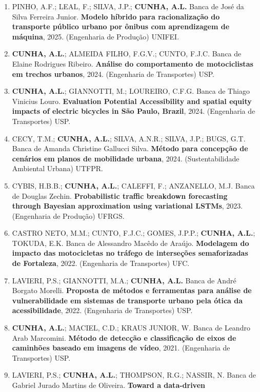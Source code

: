 \documentclass[
  brazilian,
  11pt,
  a4paper,
]{article}
\begin{document}
\begin{enumerate}
\def\labelenumi{\arabic{enumi}.}
\item
  PINHO, A.F.; LEAL, F.; SILVA, J.P.; \textbf{CUNHA, A.L.} Banca de José
  da Silva Ferreira Junior. \textbf{Modelo híbrido para racionalização
  do transporte público urbano por ônibus com aprendizagem de máquina},
  2025. (Engenharia de Produção) UNIFEI.
\item
  \textbf{CUNHA, A.L.}; ALMEIDA FILHO, F.G.V.; CUNTO, F.J.C. Banca de
  Elaine Rodrigues Ribeiro. \textbf{Análise do comportamento de
  motociclistas em trechos urbanos}, 2024. (Engenharia de Transportes)
  USP.
\item
  \textbf{CUNHA, A.L.}; GIANNOTTI, M.; LOUREIRO, C.F.G. Banca de Thiago
  Vinicius Louro. \textbf{Evaluation Potential Accessibility and spatial
  equity impacts of electric bicycles in São Paulo, Brazil}, 2024.
  (Engenharia de Transportes) USP.
\item
  CECY, T.M.; \textbf{CUNHA, A.L.}; SILVA, A.N.R.; SILVA, J.P.; BUGS,
  G.T. Banca de Amanda Christine Gallucci Silva. \textbf{Método para
  concepção de cenários em planos de mobilidade urbana}, 2024.
  (Sustentabilidade Ambiental Urbana) UTFPR.
\item
  CYBIS, H.B.B.; \textbf{CUNHA, A.L.}; CALEFFI, F.; ANZANELLO, M.J.
  Banca de Douglas Zechin. \textbf{Probabilistic traffic breakdown
  forecasting through Bayesian approximation using variational LSTMs},
  2023. (Engenharia de Produção) UFRGS.
\item
  CASTRO NETO, M.M.; CUNTO, F.J.C.; GOMES, J.P.P.; \textbf{CUNHA, A.L.};
  TOKUDA, E.K. Banca de Alessandro Macêdo de Araújo. \textbf{Modelagem
  do impacto das motocicletas no tráfego de interseções semaforizadas de
  Fortaleza}, 2022. (Engenharia de Transportes) UFC.
\item
  LAVIERI, P.S.; GIANNOTTI, M.A.; \textbf{CUNHA, A.L.} Banca de André
  Borgato Morelli. \textbf{Proposta de métodos e ferramentas para
  análise de vulnerabilidade em sistemas de transporte urbano pela ótica
  da acessibilidade}, 2022. (Engenharia de Transportes) USP.
\item
  \textbf{CUNHA, A.L.}; MACIEL, C.D.; KRAUS JUNIOR, W. Banca de Leandro
  Arab Marcomini. \textbf{Método de detecção e classificação de eixos de
  caminhões baseado em imagens de vídeo}, 2021. (Engenharia de
  Transportes) USP.
\item
  LAVIERI, P.S.; \textbf{CUNHA, A.L.}; THOMPSON, R.G.; NASSIR, N. Banca
  de Gabriel Jurado Martins de Oliveira. \textbf{Toward a data-driven
}
\end{enumerate}
\end{document}

